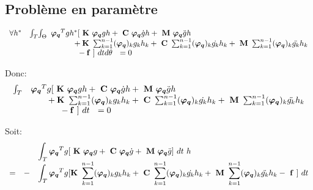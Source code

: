 \documentclass[12pt,a4paper]{report}
\begin{document}
\subsection{Problème en paramètre}
\begin{equation}
\begin{array}{r r l}
	\forall h^*
	&\int_T \! \int_\Theta \!\!\!&		
		\boldsymbol{\varphi_q}^Tgh^* [~\mathbf{K}~ \boldsymbol{\varphi_q}gh
						+ ~\mathbf{C}~ \boldsymbol{\varphi_q} \dot{g}h 
						+ ~\mathbf{M}~ \boldsymbol{\varphi_q} \ddot{g}h
	\\
	  &&
		\phantom{\boldsymbol{\varphi_q}g^*h
			}+ \mathbf{K}~ \sum_{k=1}^{n-1} (\boldsymbol{\varphi_q})_k       g_k  h_k 
			+ ~\mathbf{C}~ \sum_{k=1}^{n-1} (\boldsymbol{\varphi_q})_k  \dot{g_k} h_k 
			+ ~\mathbf{M}~ \sum_{k=1}^{n-1} (\boldsymbol{\varphi_q})_k \ddot{g_k} h_k
	\\
	  &&
		\phantom{\boldsymbol{\varphi_q}^{*T}gh} -\mathbf{f}~] ~dt d\theta ~~=0
\end{array}
\end{equation}

Donc:
\begin{equation}
\begin{array}{r l}
	\int_T &		
		\boldsymbol{\varphi_q}^Tg [~\mathbf{K}~ \boldsymbol{\varphi_q}gh
						+ ~\mathbf{C}~ \boldsymbol{\varphi_q} \dot{g}h 
						+ ~\mathbf{M}~ \boldsymbol{\varphi_q} \ddot{g}h
	\\
	  &
		\phantom{\boldsymbol{\varphi_q}h
			}+ \mathbf{K}~ \sum_{k=1}^{n-1} (\boldsymbol{\varphi_q})_k       g_k  h_k 
			+ ~\mathbf{C}~ \sum_{k=1}^{n-1} (\boldsymbol{\varphi_q})_k  \dot{g_k} h_k 
			+ ~\mathbf{M}~ \sum_{k=1}^{n-1} (\boldsymbol{\varphi_q})_k \ddot{g_k} h_k
	\\
	  &
		\phantom{\boldsymbol{\varphi_q}^{*T}gh} -\mathbf{f}~] ~dt ~~=0
\end{array}
\end{equation}

Soit:
\begin{equation}
\begin{array}{r r l}
	&& \displaystyle
		\int_T
			\boldsymbol{\varphi_q}^Tg [  ~\mathbf{K}~ \boldsymbol{\varphi_q} g
				+ ~\mathbf{C}~ \boldsymbol{\varphi_q} \dot{g}
				+ ~\mathbf{M}~ \boldsymbol{\varphi_q} \ddot{g}
				] ~dt
	~ h
	\\
	= &-& \displaystyle
		\int_T
			\boldsymbol{\varphi_q}^Tg [  \mathbf{K}~ \sum_{k=1}^{n-1} (\boldsymbol{\varphi_q})_k       g_k  h_k 
				+ ~\mathbf{C}~ \sum_{k=1}^{n-1} (\boldsymbol{\varphi_q})_k  \dot{g_k} h_k 
				+ ~\mathbf{M}~ \sum_{k=1}^{n-1} (\boldsymbol{\varphi_q})_k \ddot{g_k} h_k
				- ~\mathbf{f}~] ~dt
\end{array}
\end{equation}
\newpage
\end{document}
